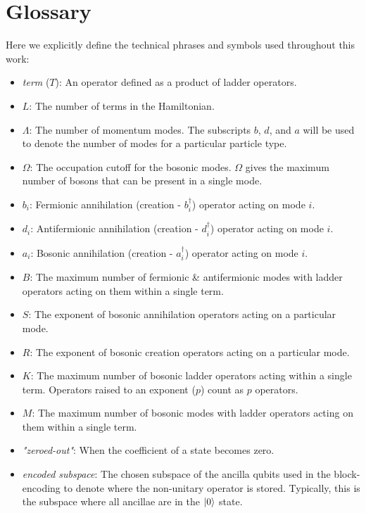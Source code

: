 \section{Glossary}
\label{sec:glossary}

Here we explicitly define the technical phrases and symbols used throughout this work:

\begin{itemize}
    \item \textit{term} ($T$): An operator defined as a product of ladder operators.
    \item $L$: The number of terms in the Hamiltonian.
    \item $\Lambda$: The number of momentum modes. The subscripts $b$, $d$, and $a$ will be used to denote the number of modes for a particular particle type.
    \item $\Omega$: The occupation cutoff for the bosonic modes. $\Omega$ gives the maximum number of bosons that can be present in a single mode. 
    \item $b_i$: Fermionic annihilation (creation - $b_i^\dagger$) operator acting on mode $i$.
    \item $d_i$: Antifermionic annihilation (creation - $d_i^\dagger$) operator acting on mode $i$.
    \item $a_i$: Bosonic annihilation (creation - $a_i^\dagger$) operator acting on mode $i$.
    \item $B$: The maximum number of fermionic \& antifermionic modes with ladder operators acting on them within a single term.
    \item $S$: The exponent of bosonic annihilation operators acting on a particular mode.
    \item $R$: The exponent of bosonic creation operators acting on a particular mode.
    \item $K$: The maximum number of bosonic ladder operators acting within a single term. Operators raised to an exponent ($p$) count as $p$ operators.
    \item $M$: The maximum number of bosonic modes with ladder operators acting on them within a single term.
    \item \textit{"zeroed-out"}: When the coefficient of a state becomes zero.
    \item \textit{encoded subspace}: The chosen subspace of the ancilla qubits used in the block-encoding to denote where the non-unitary operator is stored. Typically, this is the subspace where all ancillae are in the $\ket{0}$ state.
\end{itemize}
